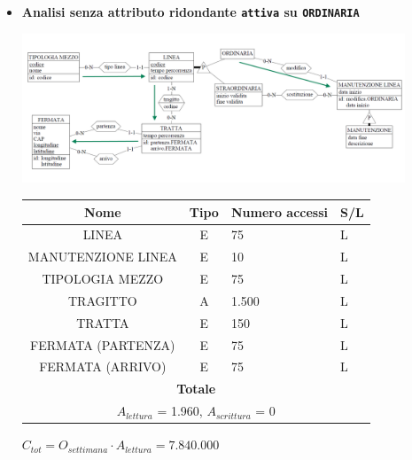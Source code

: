 \documentclass[12pt,a4paper]{report}
\begin{document}
\begin{enumerate}[label=\textbf{\arabic*)}]
\begin{itemize}
    \item \textbf{Analisi senza attributo ridondante \texttt{attiva} su \texttt{ORDINARIA}}
    \begin{center}
    \includegraphics[width=0.9\textwidth]{VisualLineeNoRid}
    \end{center}
    \begin{table}[H]
    \centering
    \begin{tabular}{|c|c|l|l|}
    \hline
    \textbf{Nome} & \textbf{Tipo} & \textbf{Numero accessi} & \textbf{S/L} \\
    \hline
    LINEA & E & 75 & L \\
    \hline
    MANUTENZIONE LINEA & E & 10 & L \\
    \hline
    TIPOLOGIA MEZZO & E & 75 & L \\
    \hline
    TRAGITTO & A & 1.500 & L \\
    \hline
    TRATTA & E & 150 & L \\
    \hline
    FERMATA (PARTENZA) & E & 75 & L \\
    \hline
    FERMATA (ARRIVO) & E & 75 & L \\
    \hline
    \multicolumn{4}{c}{\textbf{Totale}} \\
    \multicolumn{4}{c}{${A_{lettura}}$ = 1.960, ${A_{scrittura}}$ = 0} \\
    \hline
    \end{tabular}
    \end{table}
    \begin{center}
    ${C_{tot} = {O_{settimana}}\cdot{A_{lettura}}= 7.840.000}$
    \end{center}
    \end{itemize}



\end{enumerate}
\end{document}
